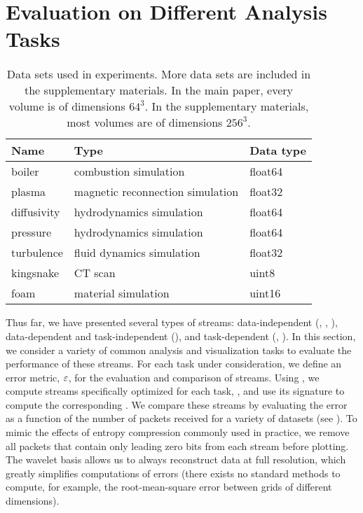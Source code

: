 \section{Evaluation on Different Analysis Tasks} \label{sec:analysis-tasks}

\begin{table}[t]
	\caption{Data sets used in experiments. More data sets are included in the
	supplementary materials. In the main paper, every volume is of dimensions $64^3$. In the 
	supplementary materials, most volumes are of dimensions $256^3$.}
  \centering
	\begin{tabular}{l l l}
  \hline
  Name & Type & Data type \\
  \hline
  boiler & combustion simulation& float64\\
  plasma & magnetic reconnection simulation& float32\\
  diffusivity & hydrodynamics simulation& float64\\
  pressure & hydrodynamics simulation& float64\\
	turbulence & fluid dynamics simulation& float32\\
	kingsnake & CT scan & uint8\\
	foam & material simulation & uint16\\
  \hline
  \end{tabular}\label{tbl:data-sets}
\end{table}

Thus far, we have presented several types of streams: data-independent (\slvl, \sbit, \swav),
data-dependent and task-independent (\smag), and task-dependent (\sopt, \ssig). In this section, we
consider a variety of common analysis and visualization tasks to evaluate the performance of these
streams. For each task under consideration, we define an error metric, $\err$, for the evaluation
and comparison of streams. Using , we compute streams specifically optimized for
each task, \stkop, and use its signature to compute the corresponding \stksg. We compare these
streams by evaluating the error as a function of the number of packets received for a variety of
datasets (see ). To mimic the effects of entropy compression commonly used in
practice, we remove all packets that contain only leading zero bits from each stream before
plotting. The wavelet basis allows us to always reconstruct data at full resolution, which greatly
simplifies computations of errors (there exists no standard methods to compute, for example, the
root-mean-square error between grids of different dimensions).


